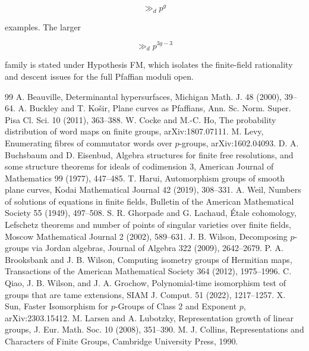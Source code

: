 \documentclass[11pt]{article}
\begin{document}
\[
\gg_d p^g
\]

examples. The larger

\[
\gg_d p^{3g-3}
\]

family is stated under Hypothesis FM, which isolates the finite-field rationality and descent issues for the full Pfaffian moduli open.

\begin{thebibliography}{99}
 A. Beauville, Determinantal hypersurfaces, Michigan Math. J. 48 (2000), 39--64.
 A. Buckley and T. Košir, Plane curves as Pfaffians, Ann. Sc. Norm. Super. Pisa Cl. Sci. 10 (2011), 363--388.
 W. Cocke and M.-C. Ho, The probability distribution of word maps on finite groups, arXiv:1807.07111.
 M. Levy, Enumerating fibres of commutator words over $p$-groups, arXiv:1602.04093.
 D. A. Buchsbaum and D. Eisenbud, Algebra structures for finite free resolutions, and some structure theorems for ideals of codimension 3, American Journal of Mathematics 99 (1977), 447--485.
 T. Harui, Automorphism groups of smooth plane curves, Kodai Mathematical Journal 42 (2019), 308--331.
 A. Weil, Numbers of solutions of equations in finite fields, Bulletin of the American Mathematical Society 55 (1949), 497--508.
 S. R. Ghorpade and G. Lachaud, Étale cohomology, Lefschetz theorems and number of points of singular varieties over finite fields, Moscow Mathematical Journal 2 (2002), 589--631.
 J. B. Wilson, Decomposing $p$-groups via Jordan algebras, Journal of Algebra 322 (2009), 2642--2679.
 P. A. Brooksbank and J. B. Wilson, Computing isometry groups of Hermitian maps, Transactions of the American Mathematical Society 364 (2012), 1975--1996.
 C. Qiao, J. B. Wilson, and J. A. Grochow, Polynomial-time isomorphism test of groups that are tame extensions, SIAM J. Comput. 51 (2022), 1217--1257.
 X. Sun, Faster Isomorphism for $p$-Groups of Class 2 and Exponent $p$, arXiv:2303.15412.
 M. Larsen and A. Lubotzky, Representation growth of linear groups, J. Eur. Math. Soc. 10 (2008), 351--390.
 M. J. Collins, Representations and Characters of Finite Groups, Cambridge University Press, 1990.
\end{thebibliography}
\end{document}
